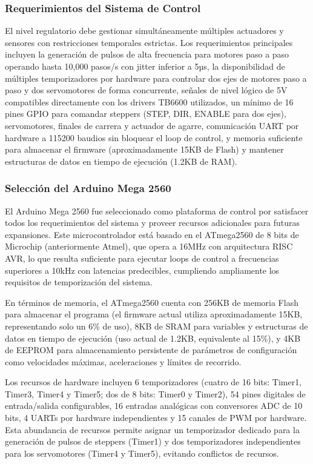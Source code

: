 \subsubsection{Requerimientos del Sistema de Control}

El nivel regulatorio debe gestionar simultáneamente múltiples actuadores y sensores con restricciones temporales estrictas. Los requerimientos principales incluyen la generación de pulsos de alta frecuencia para motores paso a paso operando hasta 10,000 pasos/s con jitter inferior a 5µs, la disponibilidad de múltiples temporizadores por hardware para controlar dos ejes de motores paso a paso y dos servomotores de forma concurrente, señales de nivel lógico de 5V compatibles directamente con los drivers TB6600 utilizados, un mínimo de 16 pines GPIO para comandar steppers (STEP, DIR, ENABLE para dos ejes), servomotores, finales de carrera y actuador de agarre, comunicación UART por hardware a 115200 baudios sin bloquear el loop de control, y memoria suficiente para almacenar el firmware (aproximadamente 15KB de Flash) y mantener estructuras de datos en tiempo de ejecución (1.2KB de RAM).

\subsubsection{Selección del Arduino Mega 2560}

El Arduino Mega 2560 fue seleccionado como plataforma de control por satisfacer todos los requerimientos del sistema y proveer recursos adicionales para futuras expansiones. Este microcontrolador está basado en el ATmega2560 de 8 bits de Microchip (anteriormente Atmel), que opera a 16MHz con arquitectura RISC AVR, lo que resulta suficiente para ejecutar loops de control a frecuencias superiores a 10kHz con latencias predecibles, cumpliendo ampliamente los requisitos de temporización del sistema.

En términos de memoria, el ATmega2560 cuenta con 256KB de memoria Flash para almacenar el programa (el firmware actual utiliza aproximadamente 15KB, representando solo un 6\% de uso), 8KB de SRAM para variables y estructuras de datos en tiempo de ejecución (uso actual de 1.2KB, equivalente al 15\%), y 4KB de EEPROM para almacenamiento persistente de parámetros de configuración como velocidades máximas, aceleraciones y límites de recorrido.

Los recursos de hardware incluyen 6 temporizadores (cuatro de 16 bits: Timer1, Timer3, Timer4 y Timer5; dos de 8 bits: Timer0 y Timer2), 54 pines digitales de entrada/salida configurables, 16 entradas analógicas con conversores ADC de 10 bits, 4 UARTs por hardware independientes y 15 canales de PWM por hardware. Esta abundancia de recursos permite asignar un temporizador dedicado para la generación de pulsos de steppers (Timer1) y dos temporizadores independientes para los servomotores (Timer4 y Timer5), evitando conflictos de recursos.


